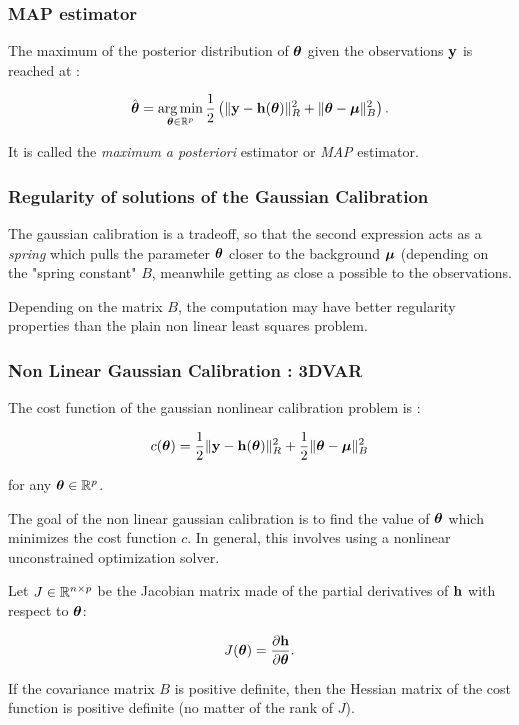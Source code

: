 \documentclass{beamer}
\begin{document}
\begin{frame}
\frametitle{MAP estimator}

The maximum of the posterior distribution of $\boldsymbol{\theta}$ given
the observations ${\bf y}$ is reached at :

$$
   \hat{\boldsymbol{\theta}} = \operatorname*{arg\,min}_{\boldsymbol{\theta}\in\mathbb{R}^p} \frac{1}{2} \left( \|{\bf y} - {\bf h}(\boldsymbol{\theta})\|^2_R 
   + \|\boldsymbol{\theta}-\boldsymbol{\mu} \|^2_B \right).
$$

It is called the \emph{maximum a posteriori} estimator or \emph{MAP}
estimator.
\end{frame}

\begin{frame}
\frametitle{Regularity of solutions of the Gaussian Calibration}

The gaussian calibration is a tradeoff, so that the second expression
acts as a \emph{spring} which pulls the parameter $\boldsymbol{\theta}$
closer to the background $\boldsymbol{\mu}$ (depending on the "spring
constant" $B$, meanwhile getting as close a possible to the
observations. 

Depending on the matrix $B$, the computation may
have better regularity properties than the plain non linear least
squares problem.
\end{frame}

\begin{frame}
\frametitle{Non Linear Gaussian Calibration : 3DVAR}

The cost function of the gaussian nonlinear calibration problem is :

$$
c(\boldsymbol{\theta}) = \frac{1}{2}\|{\bf y}-{\bf h}(\boldsymbol{\theta})\|^2_R 
   + \frac{1}{2}\|\boldsymbol{\theta}-\boldsymbol{\mu} \|^2_B
$$

for any $\boldsymbol{\theta}\in\mathbb{R}^p$.

The goal of the non linear gaussian calibration is to find the value of
$\boldsymbol{\theta}$ which minimizes the cost function $c$. In
general, this involves using a nonlinear unconstrained optimization
solver.

Let $J \in \mathbb{R}^{n \times p}$ be the Jacobian matrix made of
the partial derivatives of ${\bf h}$ with respect to
$\boldsymbol{\theta}$:

$$
J(\boldsymbol{\theta}) = \frac{\partial {\bf h}}{\partial \boldsymbol{\theta}}.
$$

If the covariance matrix $B$ is positive definite, then the
Hessian matrix of the cost function is positive definite 
(no matter of the rank of $J$). 

\end{frame}
\end{document}
